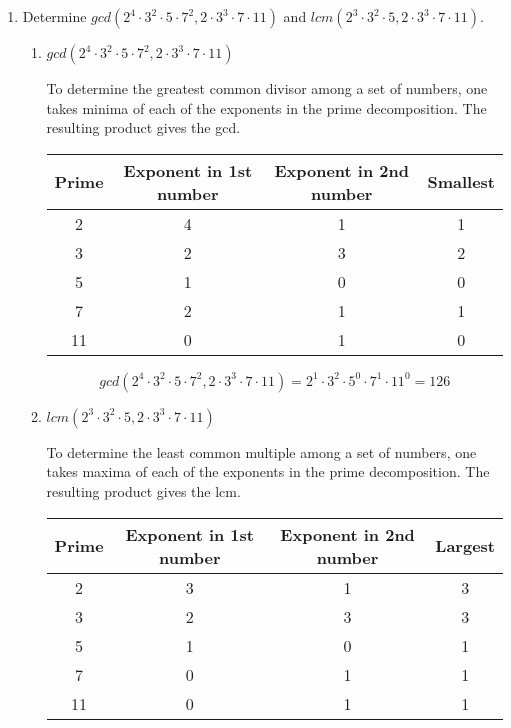 \documentclass[12pt,letterpaper,reqno]{amsart}
\begin{document}
\begin{enumerate}
\item Determine $gcd(2^4 \cdot 3^2 \cdot 5 \cdot 7^2, 2 \cdot 3^3 \cdot 7 \cdot 11)$ and $lcm(2^3 \cdot 3^2 \cdot 5,2 \cdot 3^3 \cdot 7 \cdot 11)$.
\begin{enumerate}
    \item $gcd(2^4 \cdot 3^2 \cdot 5 \cdot 7^2, 2 \cdot 3^3 \cdot 7 \cdot 11)$
    \begin{flushleft}
    To determine the greatest common divisor among a set of numbers, one takes minima of each of the exponents in the prime decomposition. The resulting product gives the gcd.\newline
    \end{flushleft}
        \begin{center}
            \begin{tabular}{|c c c c|} 
                \hline
                Prime & Exponent in 1st number & Exponent in 2nd number & Smallest \\ 
                \hline
                2 & 4 & 1 & 1 \\ 
                \hline
                3 & 2 & 3 & 2 \\
                \hline
                5 & 1 & 0 & 0 \\
                \hline
                7 & 2 & 1 & 1 \\
                \hline
                11 & 0 & 1 & 0 \\
                \hline
            \end{tabular}
        \end{center}
        $$gcd(2^4 \cdot 3^2 \cdot 5 \cdot 7^2, 2 \cdot 3^3 \cdot 7 \cdot 11) = 2^1 \cdot 3^2 \cdot 5^0 \cdot 7^1 \cdot 11^0 = 126$$
    \item $lcm(2^3 \cdot 3^2 \cdot 5,2 \cdot 3^3 \cdot 7 \cdot 11)$
    \begin{flushleft}
    To determine the least common multiple among a set of numbers, one takes maxima of each of the exponents in the prime decomposition. The resulting product gives the lcm.\newline
    \end{flushleft}
        \begin{center}
            \begin{tabular}{|c c c c|} 
                \hline
                Prime & Exponent in 1st number & Exponent in 2nd number & Largest \\ 
                \hline
                2 & 3 & 1 & 3 \\ 
                \hline
                3 & 2 & 3 & 3 \\
                \hline
                5 & 1 & 0 & 1 \\
                \hline
                7 & 0 & 1 & 1 \\
                \hline
                11 & 0 & 1 & 1 \\ 
                \hline
            \end{tabular}
        \end{center}
        

\end{enumerate}
\end{enumerate}
\end{document}
